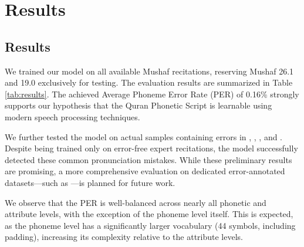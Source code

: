 
\chapter{Results} %

\label{Chapter6} %





\section{Results}

We trained our model on all available Mushaf recitations, reserving Mushaf 26.1 and 19.0 exclusively for testing. The evaluation results are summarized in Table \ref{tab:results}. The achieved Average Phoneme Error Rate (PER) of 0.16\% strongly supports our hypothesis that the Quran Phonetic Script is learnable using modern speech processing techniques.

We further tested the model on actual samples containing errors in , , , and . Despite being trained only on error-free expert recitations, the model successfully detected these common pronunciation mistakes. While these preliminary results are promising, a more comprehensive evaluation on dedicated error-annotated datasets—such as \cite{khan2021tarteel}—is planned for future work.

We observe that the PER is well-balanced across nearly all phonetic and attribute levels, with the exception of the phoneme level itself. This is expected, as the phoneme level has a significantly larger vocabulary (44 symbols, including padding), increasing its complexity relative to the attribute levels.


